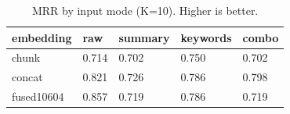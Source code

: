\begin{table}
\caption{MRR by input mode (K=10). Higher is better.}
\label{tab:mrr-by-mode}
\begin{tabular}{lllll}
\toprule
embedding & raw & summary & keywords & combo \\
\midrule
chunk & 0.714 & 0.702 & 0.750 & 0.702 \\
concat & 0.821 & 0.726 & 0.786 & 0.798 \\
fused10604 & 0.857 & 0.719 & 0.786 & 0.719 \\
\bottomrule
\end{tabular}
\end{table}
